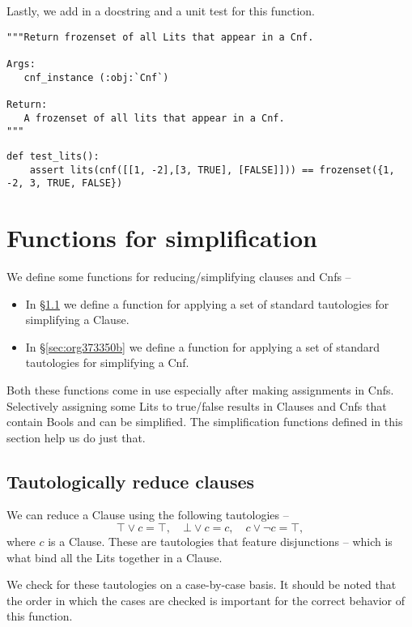 \documentclass[11pt]{article}
\begin{document}
Lastly, we add in a docstring and a unit test for this function.
\begin{verbatim}
"""Return frozenset of all Lits that appear in a Cnf.

Args:
   cnf_instance (:obj:`Cnf`)

Return:
   A frozenset of all lits that appear in a Cnf.
"""
\end{verbatim}

\begin{verbatim}
def test_lits():
    assert lits(cnf([[1, -2],[3, TRUE], [FALSE]])) == frozenset({1, -2, 3, TRUE, FALSE})
\end{verbatim}
\section{Functions for simplification}
\label{sec:org2d8bb5f}
We define some functions for reducing/simplifying clauses and Cnfs --
\begin{itemize}
\item In \S \ref{sec:org7a3de96} we define a function for applying a set
of standard tautologies for simplifying a Clause.
\item In \S \ref{sec:org373350b} we define a function for applying a set
of standard tautologies for simplifying a Cnf.
\end{itemize}

Both these functions come in use especially after making assignments in
Cnfs. Selectively assigning some Lits to true/false results in Clauses and
Cnfs that contain Bools and can be simplified. The simplification functions
defined in this section help us do just that.

\subsection{Tautologically reduce clauses}
\label{sec:org7a3de96}
We can reduce a Clause using the following tautologies -- \[\top \vee c =
\top, \quad \bot \vee c = c,\quad c \vee \neg c = \top,\] where \(c\) is a
Clause. These are tautologies that feature disjunctions -- which is what
bind all the Lits together in a Clause.

We check for these tautologies on a case-by-case basis. It should be noted
that the order in which the cases are checked is important for the correct
behavior of this function.
\end{document}
